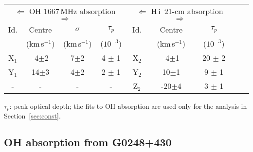 \documentclass[iop,apjl,numberedappendix,appendixfloats,twocolappendix,revtex4]{emulateapj}
\newcommand{\hi}{\mbox{H\,{\sc i}}}
\newcommand{\kms}{km\,s$^{-1}$}
\begin{document}
\begin{table}
\begin{center}
\begin{tabular}{ccccccccc}
  \multicolumn{4}{c}{$\Longleftarrow$  OH 1667\,MHz absorption $\Longrightarrow$}   &                     
  \multicolumn{3}{c}{$\Longleftarrow$  \hi\ 21-cm absorption $\Longrightarrow$}                        \\
{\large \strut}     Id.    &    Centre     &  $\sigma$            &   $\tau_p$     &   Id.                &    Centre   &  $\tau_p$      \\
                           &   (\kms)      &   (\kms)             &   ($10^{-3}$)  &                      &    (\kms)   &  ($10^{-3}$)      \\
\hline
                X$_1$      &   -4$\pm$2      & 7$\pm$2      & 4  $\pm$ 1 &  X$_2$ &  -4$\pm$1   & 20 $\pm$ 2             \\
                Y$_1$      &   14$\pm$3      & 4$\pm$2      & 2  $\pm$ 1 &  Y$_2$ &  10$\pm$1   &  9 $\pm$ 1            \\
                  -        &       -         &    -         &      -     &  Z$_2$ & -20$\pm$4   &  3 $\pm$ 1            \\
\hline
\end{tabular}
\label{ohmgauss}
\end{center}
$\tau_p$: peak optical depth; the fits to OH absorption are used only for the analysis in Section~\ref{sec:const}.
\end{table}

\subsection{OH absorption from G0248+430}    
\label{sec:ohabs}  
\end{document}
